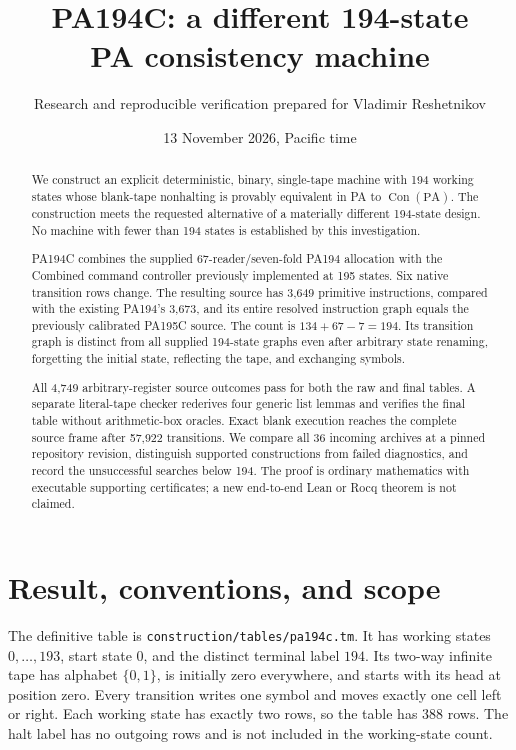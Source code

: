 \documentclass[11pt,letterpaper]{article}
\title{PA194C: a different 194-state\\PA consistency machine}
\author{Research and reproducible verification prepared for Vladimir Reshetnikov}
\date{13 November 2026, Pacific time}
\newcommand{\PA}{\mathrm{PA}}
\newcommand{\Con}{\operatorname{Con}}
\newcommand{\file}[1]{\texttt{\nolinkurl{#1}}}
\begin{document}
\maketitle
\begin{abstract}
We construct an explicit deterministic, binary, single-tape machine with
194 working states whose blank-tape nonhalting is provably equivalent in
PA to $\Con(\PA)$. The construction meets the requested alternative of a
materially different 194-state design. No machine with fewer than 194
states is established by this investigation.

PA194C combines the supplied 67-reader/seven-fold PA194 allocation with
the Combined command controller previously implemented at 195 states.
Six native transition rows change. The resulting source has 3,649
primitive instructions, compared with the existing PA194's 3,673, and its
entire resolved instruction graph equals the previously calibrated PA195C
source. The count is $134+67-7=194$. Its transition graph is distinct from
all supplied 194-state graphs even after arbitrary state renaming,
forgetting the initial state, reflecting the tape, and exchanging symbols.

All 4,749 arbitrary-register source outcomes pass for both the raw and
final tables. A separate literal-tape checker rederives four generic list
lemmas and verifies the final table without arithmetic-box oracles.
Exact blank execution reaches the complete source frame after 57,922
transitions. We compare all 36 incoming archives at a pinned repository
revision, distinguish supported constructions from failed diagnostics,
and record the unsuccessful searches below 194. The proof is ordinary
mathematics with executable supporting certificates; a new end-to-end
Lean or Rocq theorem is not claimed.
\end{abstract}
\clearpage
\begingroup\small\setlength{\parskip}{0pt}\tableofcontents\endgroup
\clearpage

\section{Result, conventions, and scope}
\label{sec:result}

The definitive table is \file{construction/tables/pa194c.tm}. It has
working states $0,\ldots,193$, start state $0$, and the distinct terminal
label $194$. Its two-way infinite tape has alphabet $\{0,1\}$, is initially
zero everywhere, and starts with its head at position zero. Every transition
writes one symbol and moves exactly one cell left or right. Each working
state has exactly two rows, so the table has 388 rows. The halt label has
no outgoing rows and is not included in the working-state count.
\end{document}
